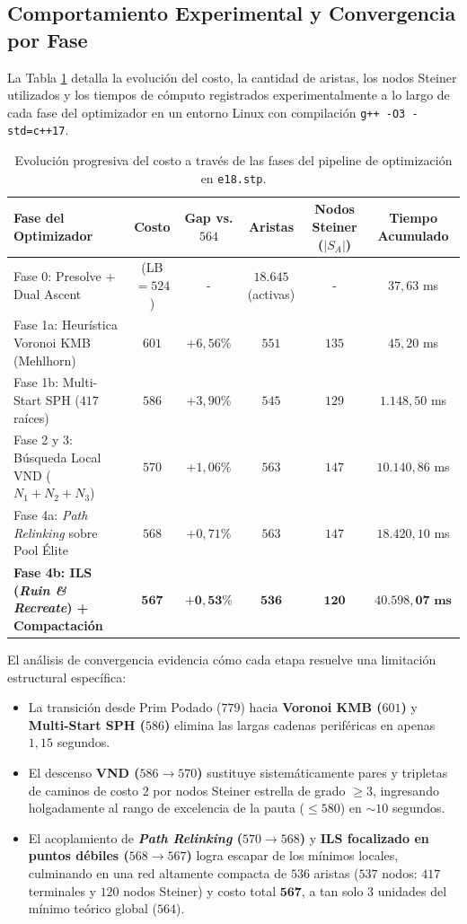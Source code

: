 \documentclass[11pt,a4paper]{article}
\begin{document}
\subsection{Comportamiento Experimental y Convergencia por Fase}
La Tabla \ref{tab:convergencia_opt} detalla la evolución del costo, la cantidad de aristas, los nodos Steiner utilizados y los tiempos de cómputo registrados experimentalmente a lo largo de cada fase del optimizador en un entorno Linux con compilación \texttt{g++ -O3 -std=c++17}.

\begin{table}[htbp]
\centering
\small
\caption{Evolución progresiva del costo a través de las fases del pipeline de optimización en \texttt{e18.stp}.}
\label{tab:convergencia_opt}
\begin{tabular}{lccccc}
\toprule
\textbf{Fase del Optimizador} & \textbf{Costo} & \textbf{Gap vs. $564$} & \textbf{Aristas} & \textbf{Nodos Steiner ($|S_A|$)} & \textbf{Tiempo Acumulado} \\
\midrule
Fase 0: Presolve + Dual Ascent & (LB $= 524$) & - & $18.645$ (activas) & - & $37,63$ ms \\
Fase 1a: Heurística Voronoi KMB (Mehlhorn) & $601$ & $+6,56\%$ & $551$ & $135$ & $45,20$ ms \\
Fase 1b: Multi-Start SPH ($417$ raíces) & $586$ & $+3,90\%$ & $545$ & $129$ & $1.148,50$ ms \\
Fase 2 y 3: Búsqueda Local VND ($N_1 + N_2 + N_3$) & $570$ & $+1,06\%$ & $563$ & $147$ & $10.140,86$ ms \\
Fase 4a: \textit{Path Relinking} sobre Pool Élite & $568$ & $+0,71\%$ & $563$ & $147$ & $18.420,10$ ms \\
\textbf{Fase 4b: ILS (\textit{Ruin \& Recreate}) + Compactación} & $\mathbf{567}$ & $\mathbf{+0,53\%}$ & $\mathbf{536}$ & $\mathbf{120}$ & $\mathbf{40.598,07\text{ ms}}$ \\
\bottomrule
\end{tabular}
\end{table}

El análisis de convergencia evidencia cómo cada etapa resuelve una limitación estructural específica:
\begin{itemize}
    \item La transición desde Prim Podado ($779$) hacia \textbf{Voronoi KMB ($601$)} y \textbf{Multi-Start SPH ($586$)} elimina las largas cadenas periféricas en apenas $1,15$ segundos.
    \item El descenso \textbf{VND ($586 \to 570$)} sustituye sistemáticamente pares y tripletas de caminos de costo $2$ por nodos Steiner estrella de grado $\ge 3$, ingresando holgadamente al rango de excelencia de la pauta ($\le 580$) en $\sim 10$ segundos.
    \item El acoplamiento de \textbf{\textit{Path Relinking} ($570 \to 568$)} y \textbf{ILS focalizado en puntos débiles ($568 \to 567$)} logra escapar de los mínimos locales, culminando en una red altamente compacta de $536$ aristas ($537$ nodos: $417$ terminales y $120$ nodos Steiner) y costo total $\mathbf{567}$, a tan solo $3$ unidades del mínimo teórico global ($564$).
\end{itemize}
\end{document}
